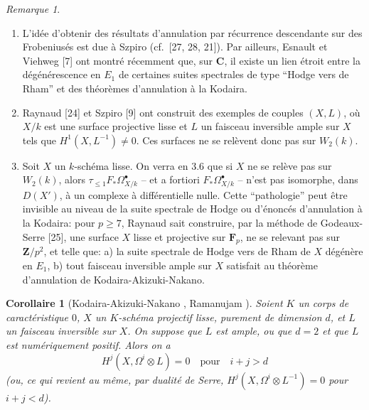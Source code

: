 \documentclass[12pt,a4paper]{article}
\theoremstyle{plain}
\newtheorem{corollary}[theorem]{Corollaire}
\theoremstyle{definition}
\theoremstyle{remark}
\newtheorem{remark}[theorem]{Remarque}
\begin{document}
\begin{remark}\label{rem:2.10}
\begin{enumerate}[label=(\roman*)]
\item L'id\'ee d'obtenir des r\'esultats d'annulation par r\'ecurrence descendante sur des Frobenius\'es est due \`a Szpiro (cf.~[27, 28, 21]). Par ailleurs, Esnault et Viehweg [7] ont montr\'e r\'ecemment que, sur $\mathbf{C}$, il existe un lien \'etroit entre la d\'eg\'en\'erescence en $E_1$ de certaines suites spectrales de type ``Hodge vers de Rham'' et des th\'eor\`emes d'annulation \`a la Kodaira.

\item Raynaud [24] et Szpiro [9] ont construit des exemples de couples $(X, L)$, o\`u $X/k$ est une surface projective lisse et $L$ un faisceau inversible ample sur $X$ tels que $H^1(X, L^{-1}) \neq 0$. Ces surfaces ne se rel\`event donc pas sur $W_2(k)$.

\item Soit $X$ un $k$-sch\'ema lisse. On verra en 3.6 que si $X$ ne se rel\`eve pas sur $W_2(k)$, alors $\tau_{\le 1} F_* \Omega^{\bullet}_{X/k}$ -- et a fortiori $F_* \Omega^{\bullet}_{X/k}$ -- n'est pas isomorphe, dans $D(X')$, \`a un complexe \`a diff\'erentielle nulle. Cette ``pathologie'' peut \^etre invisible au niveau de la suite spectrale de Hodge ou d'\'enonc\'es d'annulation \`a la Kodaira: pour $p \ge 7$, Raynaud sait construire, par la m\'ethode de Godeaux-Serre [25], une surface $X$ lisse et projective sur $\mathbf{F}_p$, ne se relevant pas sur $\mathbf{Z}/p^2$, et telle que: a) la suite spectrale de Hodge vers de Rham de $X$ d\'eg\'en\`ere en $E_1$, b) tout faisceau inversible ample sur $X$ satisfait au th\'eor\`eme d'annulation de Kodaira-Akizuki-Nakano.
\end{enumerate}
\end{remark}

\begin{corollary}[Kodaira-Akizuki-Nakano {\cite{1,18}}, Ramanujam {\cite{23}}]\label{cor:2.11}
Soient $K$ un corps de caract\'eristique $0$, $X$ un $K$-sch\'ema projectif lisse, purement de dimension $d$, et $L$ un faisceau inversible sur $X$. On suppose que $L$ est ample, ou que $d = 2$ et que $L$ est num\'eriquement positif. Alors on a
\[
H^j(X, \Omega^i \otimes L) = 0 \quad \text{pour} \quad i + j > d
\]
(ou, ce qui revient au m\^eme, par dualit\'e de Serre, $H^j(X, \Omega^i \otimes L^{-1}) = 0$ pour $i + j < d$).
\end{corollary}
\end{document}
